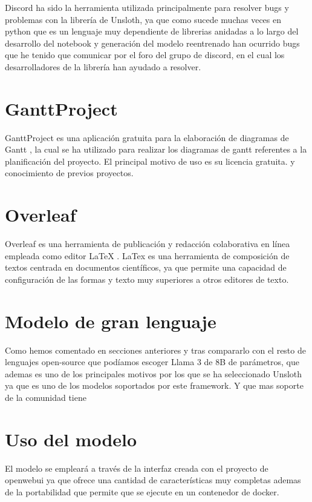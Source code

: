 Discord ha sido la herramienta utilizada principalmente para resolver bugs y problemas con la librería de Unsloth\cite{Unsloth}, ya que como sucede muchas veces en python que es un lenguaje muy dependiente de librerias anidadas a lo largo del desarrollo del notebook y generación del modelo reentrenado han ocurrido bugs que he tenido que comunicar por el foro del grupo de discord, en el cual los desarrolladores de la librería han ayudado a resolver.

\section{GanttProject}
GanttProject es una aplicación gratuita para la elaboración de diagramas de Gantt \cite{ganttProyect}, la cual se ha utilizado para realizar los diagramas de gantt referentes a la planificación del proyecto. El principal motivo de uso es su licencia gratuita. y conocimiento de previos proyectos.

\section{Overleaf}

Overleaf es una herramienta de publicación y redacción colaborativa en línea empleada como editor LaTeX \cite{overleaf}. LaTex es una herramienta de composición de textos centrada en documentos científicos, ya que permite una capacidad de configuración de las formas y texto muy superiores a otros editores de texto.

\section {Modelo de gran lenguaje}

Como hemos comentado en secciones anteriores y tras compararlo con el resto de lenguajes open-source que podíamos escoger Llama 3 de 8B de parámetros, que ademas es uno de los principales motivos por los que se ha seleccionado Unsloth ya que es uno de los modelos soportados por este framework. Y que mas soporte de la comunidad tiene

\section {Uso del modelo}

El modelo se empleará a través de la interfaz creada con el  proyecto de openwebui\cite{openwebui} ya que ofrece una cantidad de características muy completas ademas de la portabilidad que permite que se ejecute en un contenedor de docker.





